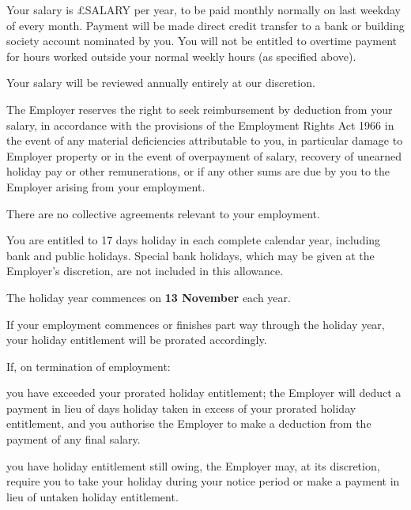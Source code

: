 \documentclass[a4paper,11pt,onecolumn ]{article}
\begin{document}
\begin{legal}
\item {}
\begin{legal}
\item Your salary is £SALARY per year, to be paid monthly normally on last weekday
of every month. Payment will be made direct credit transfer to a bank or
building society account nominated by you. You will not be entitled to overtime
payment for hours worked outside your normal weekly hours (as specified
above).
\item Your salary will be reviewed annually entirely at our discretion.
\item The Employer reserves the right to seek reimbursement by deduction from your
salary, in accordance with the provisions of the Employment Rights Act 1966 in
the event of any material deficiencies attributable to you, in particular damage
to Employer property or in the event of overpayment of salary, recovery of
unearned holiday pay or other remunerations, or if any other sums are due by
you to the Employer arising from your employment.
\end{legal}


\item {}
There are no collective agreements relevant to your employment.

\item {}
\begin{legal}
\item You are entitled to 17 days holiday in each complete calendar year, 
including bank and public holidays. Special bank holidays, which may be given at the
Employer's discretion, are not included in this allowance. 
\item The holiday year commences on \textbf{13 November} each year.
\item If your employment commences or finishes part way through the holiday year,
your holiday entitlement will be prorated accordingly.

\item If, on termination of employment:

\begin{legal}
  \item you have exceeded your prorated holiday entitlement; the Employer will
  deduct a payment in lieu of days holiday taken in excess of your prorated
  holiday entitlement, and you authorise the Employer to make a deduction
  from the payment of any final salary.
  \item you have holiday entitlement still owing, the Employer may, at its
  discretion, require you to take your holiday during your notice period or
  make a payment in lieu of untaken holiday entitlement.
\end{legal}


\end{legal}
\end{legal}
\end{document}
